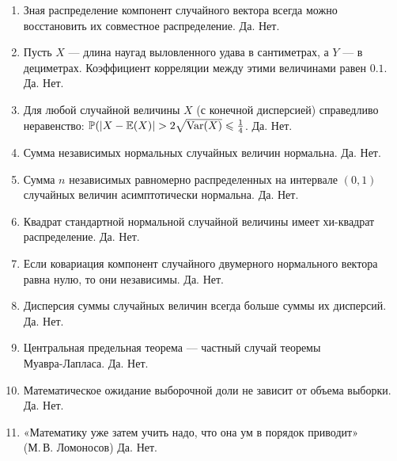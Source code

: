 \begin{enumerate}
\item{Зная распределение компонент случайного вектора всегда можно восстановить их совместное распределение. Да. Нет.}

\item{Пусть $X$ — длина наугад выловленного удава в сантиметрах, а $Y$ — в дециметрах. Коэффициент корреляции между этими величинами равен $0.1$. Да. Нет.}

\item{Для любой случайной величины $X$ (с конечной дисперсией) справедливо неравенство: $\P(|X-\E(X)|>2\sqrt{\Var(X)}\leqslant \frac{1}{4}$. Да. Нет.}

\item{Сумма независимых нормальных случайных величин нормальна. Да. Нет.}

\item{Сумма $n$ независимых равномерно распределенных на интервале $(0,1)$ случайных величин асимптотически нормальна. Да. Нет.}

\item{Квадрат стандартной нормальной случайной величины имеет хи-квадрат распределение. Да. Нет.}

\item{Если ковариация компонент случайного двумерного нормального вектора равна нулю, то они независимы. Да. Нет.}

\item{Дисперсия суммы случайных величин всегда больше суммы их дисперсий. Да. Нет.}

\item{Центральная предельная теорема –-- частный случай теоремы \\Муавра-Лапласа. Да. Нет.}

\item{Математическое ожидание выборочной доли не зависит от объема выборки. Да. Нет.}

\item{«Математику уже затем учить надо, что она ум в порядок приводит» \\ (М.\,В. Ломоносов) Да. Нет.}

\end{enumerate}

